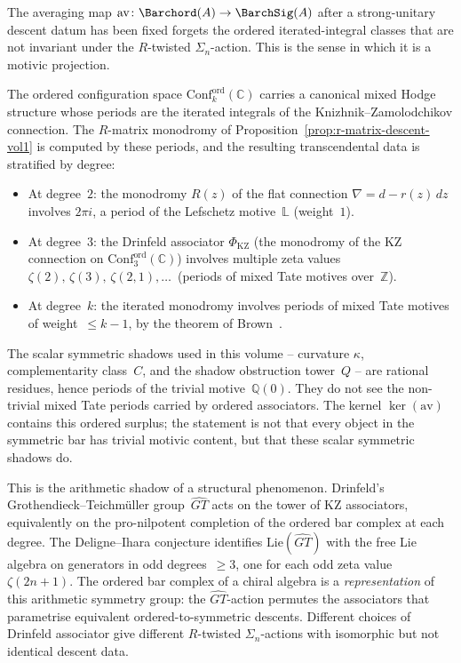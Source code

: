 \begin{remark}
\label{rem:motivic-interpretation}
The averaging map
$\mathrm{av}\colon\Barchord(A)\to\BarchSig(A)$
after a strong-unitary descent datum has been fixed
forgets the ordered iterated-integral classes that are not invariant
under the $R$-twisted $\Sigma_n$-action. This is the sense in which it
is a motivic projection.

The ordered configuration space
$\mathrm{Conf}_k^{\mathrm{ord}}(\mathbb{C})$
carries a canonical mixed Hodge structure whose periods are
the iterated integrals of the Knizhnik--Zamolodchikov connection.
The $R$-matrix monodromy of
Proposition~\ref{prop:r-matrix-descent-vol1} is computed by these
periods, and the resulting transcendental data is stratified by
degree:
\begin{itemize}
\item At degree~$2$: the monodromy $R(z)$ of the flat connection
$\nabla = d - r(z)\,dz$ involves $2\pi i$, a period of
the Lefschetz motive~$\mathbb{L}$ (weight~$1$).

\item At degree~$3$: the Drinfeld associator
$\Phi_{\mathrm{KZ}}$
(the monodromy of the KZ connection on
$\mathrm{Conf}_3^{\mathrm{ord}}(\mathbb{C})$)
involves multiple zeta values
$\zeta(2),\,\zeta(3),\,\zeta(2,1),\ldots$\
(periods of mixed Tate motives over~$\mathbb{Z}$).

\item At degree~$k$: the iterated monodromy involves
periods of mixed Tate motives of weight~$\leq k-1$,
by the theorem of Brown~\cite{brown-mzv}.
\end{itemize}

\noindent
The scalar symmetric shadows used in this volume -- curvature
$\kappa$, complementarity class~$C$, and the shadow obstruction
tower~$Q$ -- are rational residues, hence periods of the trivial
motive~$\mathbb{Q}(0)$. They do not see the non-trivial mixed Tate
periods carried by ordered associators. The kernel
$\ker(\mathrm{av})$ contains this ordered surplus; the statement is not
that every object in the symmetric bar has trivial motivic content, but
that these scalar symmetric shadows do.

This is the arithmetic shadow of a structural phenomenon.
Drinfeld's Grothendieck--Teichm\"uller group~$\widehat{GT}$
acts on the tower of KZ associators, equivalently on the
pro-nilpotent completion of the ordered bar complex at each
degree. The Deligne--Ihara conjecture identifies
$\mathrm{Lie}(\widehat{GT})$ with the free Lie algebra on
generators in odd degrees~$\geq 3$, one for each odd
zeta value~$\zeta(2n+1)$. The ordered bar complex of a
chiral algebra is a \emph{representation} of this arithmetic
symmetry group: the $\widehat{GT}$-action permutes the
associators that parametrise equivalent ordered-to-symmetric
descents. Different choices of Drinfeld associator give
different $R$-twisted $\Sigma_n$-actions with isomorphic
but not identical descent data.


\end{remark}
